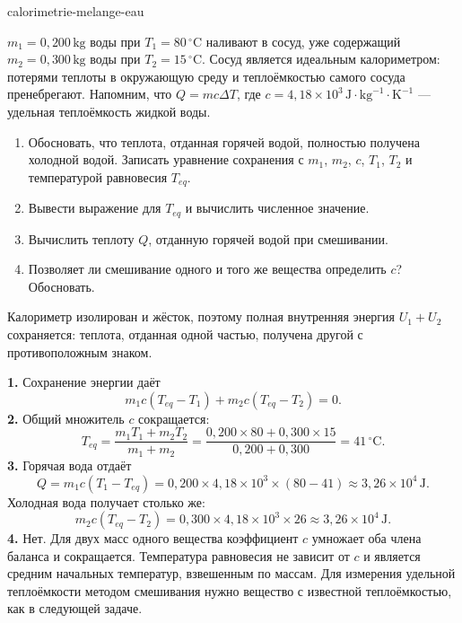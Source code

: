 \begin{exo}{calorimetrie-melange-eau}

$m_1=0{,}200\,\text{kg}$ воды при $T_1=80\,^\circ\text{C}$ наливают в сосуд, уже содержащий $m_2=0{,}300\,\text{kg}$ воды при $T_2=15\,^\circ\text{C}$. Сосуд является идеальным калориметром: потерями теплоты в окружающую среду и теплоёмкостью самого сосуда пренебрегают. Напомним, что $Q=mc\Delta T$, где $c=4{,}18\times10^3\,\text{J}\!\cdot\!\text{kg}^{-1}\!\cdot\!\text{K}^{-1}$ — удельная теплоёмкость жидкой воды.

\begin{enumerate}
  \item Обосновать, что теплота, отданная горячей водой, полностью получена холодной водой. Записать уравнение сохранения с $m_1$, $m_2$, $c$, $T_1$, $T_2$ и температурой равновесия $T_{eq}$.
  \item Вывести выражение для $T_{eq}$ и вычислить численное значение.
  \item Вычислить теплоту $Q$, отданную горячей водой при смешивании.
  \item Позволяет ли смешивание одного и того же вещества определить $c$? Обосновать.
\end{enumerate}
\begin{indication}
Калориметр изолирован и жёсток, поэтому полная внутренняя энергия $U_1+U_2$ сохраняется: теплота, отданная одной частью, получена другой с противоположным знаком.
\end{indication}
\begin{solution}
\textbf{1.} Сохранение энергии даёт
\[
m_1c(T_{eq}-T_1)+m_2c(T_{eq}-T_2)=0.
\]
\textbf{2.} Общий множитель $c$ сокращается:
\[
T_{eq}=\frac{m_1T_1+m_2T_2}{m_1+m_2}
=\frac{0{,}200\times80+0{,}300\times15}{0{,}200+0{,}300}=41\,^\circ\text{C}.
\]
\textbf{3.} Горячая вода отдаёт
\[
Q=m_1c(T_1-T_{eq})=0{,}200\times4{,}18\times10^3\times(80-41)
\approx3{,}26\times10^4\,\text{J}.
\]
Холодная вода получает столько же:
\[
m_2c(T_{eq}-T_2)=0{,}300\times4{,}18\times10^3\times26
\approx3{,}26\times10^4\,\text{J}.
\]
\textbf{4.} Нет. Для двух масс одного вещества коэффициент $c$ умножает оба члена баланса и сокращается. Температура равновесия не зависит от $c$ и является средним начальных температур, взвешенным по массам. Для измерения удельной теплоёмкости методом смешивания нужно вещество с известной теплоёмкостью, как в следующей задаче.
\end{solution}
\end{exo}

